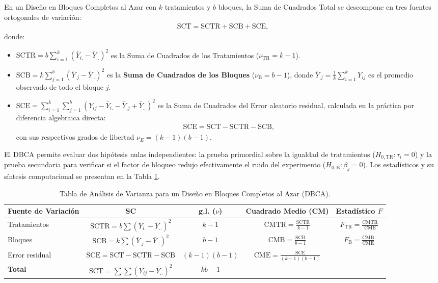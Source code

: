 \begin{teorema}
	En un Diseño en Bloques Completos al Azar con $k$ tratamientos y $b$ bloques, la Suma de Cuadrados Total se descompone en tres fuentes ortogonales de variación:
	\begin{align}
		\text{SCT} = \text{SCTR} + \text{SCB} + \text{SCE},
	\end{align}
	donde:
	\begin{itemize}
		\item $\text{SCTR} = b \sum_{i=1}^k (\bar{Y}_{i.} - \bar{Y}_{..})^2$ es la Suma de Cuadrados de los Tratamientos ($\nu_{\text{TR}} = k - 1$).
		\item $\text{SCB} = k \sum_{j=1}^b (\bar{Y}_{.j} - \bar{Y}_{..})^2$ es la \textbf{Suma de Cuadrados de los Bloques} ($\nu_{\text{B}} = b - 1$), donde $\bar{Y}_{.j} = \frac{1}{k}\sum_{i=1}^k Y_{ij}$ es el promedio observado de todo el bloque $j$.
		\item $\text{SCE} = \sum_{i=1}^k \sum_{j=1}^b (Y_{ij} - \bar{Y}_{i.} - \bar{Y}_{.j} + \bar{Y}_{..})^2$ es la Suma de Cuadrados del Error aleatorio residual, calculada en la práctica por diferencia algebraica directa:
		\begin{align}
			\text{SCE} = \text{SCT} - \text{SCTR} - \text{SCB},
		\end{align}
		con sus respectivos grados de libertad $\nu_E = (k - 1)(b - 1)$.
	\end{itemize}
\end{teorema}

El DBCA permite evaluar dos hipótesis nulas independientes: la prueba primordial sobre la igualdad de tratamientos ($H_{0,\text{TR}}: \tau_i = 0$) y la prueba secundaria para verificar si el factor de bloqueo redujo efectivamente el ruido del experimento ($H_{0,\text{B}}: \beta_j = 0$). Los estadísticos y su síntesis computacional se presentan en la Tabla \ref{tab:anova_dbca}.

\begin{table}[htbp]
	\centering
	\caption{Tabla de Análisis de Varianza para un Diseño en Bloques Completos al Azar (DBCA).}
	\label{tab:anova_dbca}
	\begin{tabular}{lcccc}
		\hline
		\textbf{Fuente de Variación} & \textbf{SC} & \textbf{g.l. ($\nu$)} & \textbf{Cuadrado Medio (CM)} & \textbf{Estadístico $F$} \\ \hline
		Tratamientos & $\text{SCTR} = b \sum (\bar{Y}_{i.} - \bar{Y}_{..})^2$ & $k - 1$ & $\text{CMTR} = \frac{\text{SCTR}}{k - 1}$ & $F_{\text{TR}} = \frac{\text{CMTR}}{\text{CME}}$ \\ [1.5ex]
		Bloques & $\text{SCB} = k \sum (\bar{Y}_{.j} - \bar{Y}_{..})^2$ & $b - 1$ & $\text{CMB} = \frac{\text{SCB}}{b - 1}$ & $F_{\text{B}} = \frac{\text{CMB}}{\text{CME}}$ \\ [1.5ex]
		Error residual & $\text{SCE} = \text{SCT} - \text{SCTR} - \text{SCB}$ & $(k-1)(b-1)$ & $\text{CME} = \frac{\text{SCE}}{(k-1)(b-1)}$ & \\ [1.5ex] \hline
		\textbf{Total} & $\text{SCT} = \sum \sum (Y_{ij} - \bar{Y}_{..})^2$ & $kb - 1$ & & \\ \hline
	\end{tabular}
\end{table}

